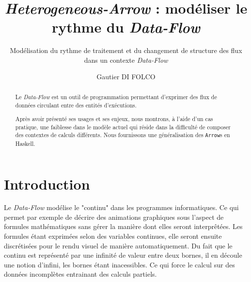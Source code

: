 \documentclass{llncs}
\newcommand{\DF}{\emph{Data-Flow} }
\newcommand{\SA}{\emph{Heterogeneous-Arrow} }
\newcommand{\Arrs}{\lstinline{Arrow}s }
\begin{document}
\title{\SA : modéliser le rythme du \DF}


\subtitle{Modélisation du rythme de traitement et du changement de structure des flux dans un contexte \DF}


\author{Gautier DI FOLCO}







\maketitle

\begin{abstract}
Le \DF est un outil de programmation permettant d'exprimer des flux de
données circulant entre des entités d'exécutions.

Après avoir présenté ses usages et ses enjeux, nous montrons, à l'aide d'un
cas pratique, une faiblesse dans le modèle actuel qui réside dans la difficulté
de composer des contextes de calculs différents.
Nous fournissons une généralisation des \Arrs en Haskell.
\end{abstract}

\section{Introduction}
Le \DF modélise le "continu" dans les programmes informatiques.
Ce qui permet par exemple de décrire des animations graphiques sous l'aspect de
formules mathématiques sans gérer la manière dont elles seront interprêtées.
Les formules étant exprimées selon des variables continues, elle seront ensuite
discrétisées pour le rendu visuel de manière automatiquement.
Du fait que le continu est représenté par une infinité de valeur entre deux bornes,
il en découle une notion d'infini, les bornes étant inacessibles.
Ce qui force le calcul sur des données incomplètes entrainant des calculs partiels.
\end{document}
